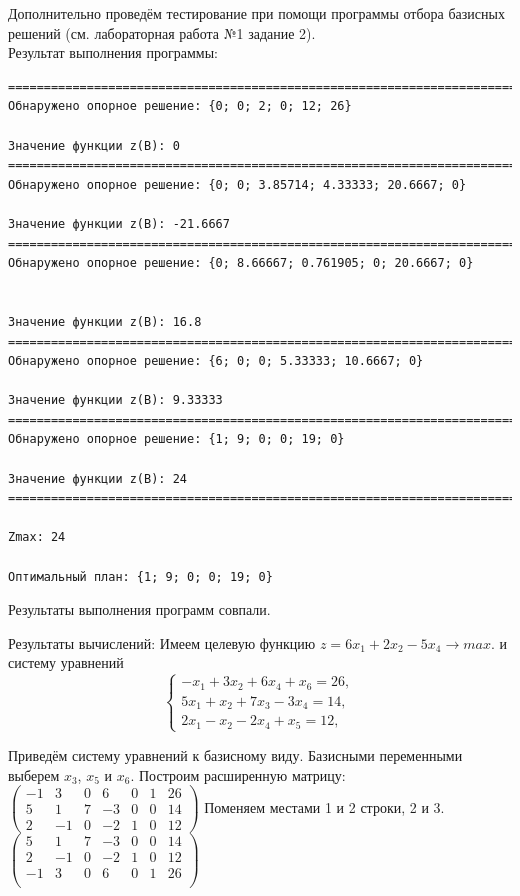 \documentclass[a4paper,14pt]{extarticle}
\begin{document}
Дополнительно проведём тестирование при помощи программы отбора базисных решений (см. лабораторная работа №1 задание 2).\\
Результат выполнения программы:
\begin{verbatim}
==================================================================================================================
Обнаружено опорное решение: {0; 0; 2; 0; 12; 26}

Значение функции z(B): 0
==================================================================================================================
Обнаружено опорное решение: {0; 0; 3.85714; 4.33333; 20.6667; 0}

Значение функции z(B): -21.6667
==================================================================================================================
Обнаружено опорное решение: {0; 8.66667; 0.761905; 0; 20.6667; 0}


Значение функции z(B): 16.8
==================================================================================================================
Обнаружено опорное решение: {6; 0; 0; 5.33333; 10.6667; 0}

Значение функции z(B): 9.33333
==================================================================================================================
Обнаружено опорное решение: {1; 9; 0; 0; 19; 0}

Значение функции z(B): 24
==================================================================================================================

Zmax: 24

Оптимальный план: {1; 9; 0; 0; 19; 0}
\end{verbatim}

Результаты выполнения программ совпали.

Результаты вычислений:\bigbreak
Имеем целевую функцию
$z = 6 x_1 + 2x_2 -5x_4 \rightarrow max$.
и систему уравнений
\begin{equation*}
    \begin{cases}
        -x_1 + 3x_2 + 6x_4 + x_6 = 26, \\
        5x_1 + x_2 + 7x_3 -3x_4 = 14,  \\
        2x_1 - x_2 - 2x_4 + x_5 = 12,
    \end{cases}
\end{equation*}

Приведём систему уравнений к базисному виду. Базисными переменными выберем $x_3$, $x_5$ и $x_6$.
Построим расширенную матрицу:\bigbreak
$\begin{pmatrix}
        -1 & 3  & 0 & 6  & 0 & 1 & 26 \\
        5  & 1  & 7 & -3 & 0 & 0 & 14 \\
        2  & -1 & 0 & -2 & 1 & 0 & 12
    \end{pmatrix}$\bigbreak
Поменяем местами 1 и 2 строки, 2 и 3.\bigbreak
$\begin{pmatrix}
        5  & 1  & 7 & -3 & 0 & 0 & 14 \\
        2  & -1 & 0 & -2 & 1 & 0 & 12 \\
        -1 & 3  & 0 & 6  & 0 & 1 & 26 \\
    \end{pmatrix}$\bigbreak
\end{document}
